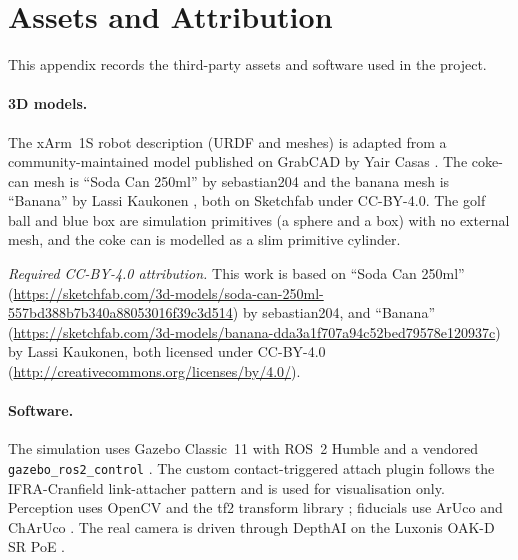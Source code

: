 \section{Assets and Attribution}\label{app:assets}
This appendix records the third-party assets and software used in the project.

\paragraph{3D models.} The xArm~1S robot description (URDF and meshes) is adapted from a
community-maintained model published on GrabCAD by Yair Casas \cite{grabcad_xarm}. The
coke-can mesh is ``Soda Can 250ml'' by sebastian204 \cite{sketchfab_cokecan} and the banana
mesh is ``Banana'' by Lassi Kaukonen \cite{sketchfab_banana}, both on Sketchfab under
CC-BY-4.0. The golf ball and blue box are simulation primitives (a sphere and a box) with no
external mesh, and the coke can is modelled as a slim primitive cylinder.

\smallskip\noindent\emph{Required CC-BY-4.0 attribution.} This work is based on ``Soda Can
250ml'' (\url{https://sketchfab.com/3d-models/soda-can-250ml-557bd388b7b340a88053016f39c3d514})
by sebastian204, and ``Banana''
(\url{https://sketchfab.com/3d-models/banana-dda3a1f707a94c52bed79578e120937c}) by Lassi
Kaukonen, both licensed under CC-BY-4.0 (\url{http://creativecommons.org/licenses/by/4.0/}).

\paragraph{Software.} The simulation uses Gazebo Classic~11 \cite{koenig2004gazebo} with
ROS~2 Humble \cite{macenski2022ros2} and a vendored \texttt{gazebo\_ros2\_control}
\cite{gazebo_ros2_control}. The custom contact-triggered attach plugin follows the
IFRA-Cranfield link-attacher pattern \cite{link_attacher} and is used for visualisation only.
Perception uses OpenCV \cite{bradski2000opencv} and the tf2 transform library
\cite{foote2013tf}; fiducials use ArUco and ChArUco
\cite{garridojurado2014aruco,romeroramirez2018charuco}. The real camera is driven through
DepthAI \cite{depthai_docs} on the Luxonis OAK-D SR PoE \cite{luxonis_oakd}.
